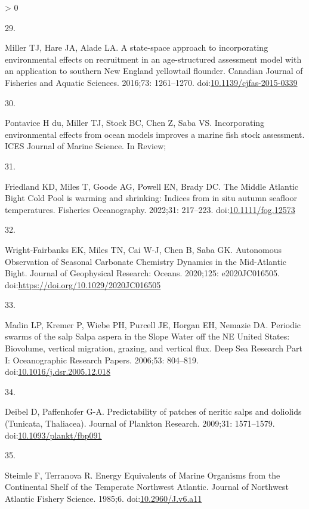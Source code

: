 \documentclass[
  10pt,
]{article}
\newlength{\cslhangindent}
\newlength{\csllabelwidth}
\newenvironment{CSLReferences}[2] %
 {%
  \setlength{\parindent}{0pt}
  \ifodd #1 \everypar{\setlength{\hangindent}{\cslhangindent}}\ignorespaces\fi
  \ifnum #2 > 0
  \setlength{\parskip}{#2\baselineskip}
  \fi
 }%
 {}
\newcommand{\CSLLeftMargin}[1]{\parbox[t]{\csllabelwidth}{#1}}
\newcommand{\CSLRightInline}[1]{\parbox[t]{\linewidth - \csllabelwidth}{#1}\break}
\begin{document}
\begin{CSLReferences}{0}{0}
\leavevmode\hypertarget{ref-miller_state-space_2016}{}%
\CSLLeftMargin{29. }
\CSLRightInline{Miller TJ, Hare JA, Alade LA. A state-space approach to
incorporating environmental effects on recruitment in an age-structured
assessment model with an application to southern {New} {England}
yellowtail flounder. Canadian Journal of Fisheries and Aquatic Sciences.
2016;73: 1261--1270.
doi:\href{https://doi.org/10.1139/cjfas-2015-0339}{10.1139/cjfas-2015-0339}}

\leavevmode\hypertarget{ref-du_pontavice_incorporating_nodate}{}%
\CSLLeftMargin{30. }
\CSLRightInline{Pontavice H du, Miller TJ, Stock BC, Chen Z, Saba VS.
Incorporating environmental effects from ocean models improves a marine
fish stock assessment. ICES Journal of Marine Science. In Review; }

\leavevmode\hypertarget{ref-friedland_middle_2022}{}%
\CSLLeftMargin{31. }
\CSLRightInline{Friedland KD, Miles T, Goode AG, Powell EN, Brady DC.
The {Middle} {Atlantic} {Bight} {Cold} {Pool} is warming and shrinking:
{Indices} from in situ autumn seafloor temperatures. Fisheries
Oceanography. 2022;31: 217--223.
doi:\href{https://doi.org/10.1111/fog.12573}{10.1111/fog.12573}}

\leavevmode\hypertarget{ref-wrightfairbanks_autonomous_2020}{}%
\CSLLeftMargin{32. }
\CSLRightInline{Wright‐Fairbanks EK, Miles TN, Cai W-J, Chen B, Saba GK.
Autonomous {Observation} of {Seasonal} {Carbonate} {Chemistry}
{Dynamics} in the {Mid}-{Atlantic} {Bight}. Journal of Geophysical
Research: Oceans. 2020;125: e2020JC016505.
doi:\url{https://doi.org/10.1029/2020JC016505}}

\leavevmode\hypertarget{ref-madin_periodic_2006}{}%
\CSLLeftMargin{33. }
\CSLRightInline{Madin LP, Kremer P, Wiebe PH, Purcell JE, Horgan EH,
Nemazie DA. Periodic swarms of the salp {Salpa} aspera in the {Slope}
{Water} off the {NE} {United} {States}: {Biovolume}, vertical migration,
grazing, and vertical flux. Deep Sea Research Part I: Oceanographic
Research Papers. 2006;53: 804--819.
doi:\href{https://doi.org/10.1016/j.dsr.2005.12.018}{10.1016/j.dsr.2005.12.018}}

\leavevmode\hypertarget{ref-deibel_predictability_2009}{}%
\CSLLeftMargin{34. }
\CSLRightInline{Deibel D, Paffenhofer G-A. Predictability of patches of
neritic salps and doliolids ({Tunicata}, {Thaliacea}). Journal of
Plankton Research. 2009;31: 1571--1579.
doi:\href{https://doi.org/10.1093/plankt/fbp091}{10.1093/plankt/fbp091}}

\leavevmode\hypertarget{ref-steimle_energy_1985}{}%
\CSLLeftMargin{35. }
\CSLRightInline{Steimle F, Terranova R. Energy {Equivalents} of {Marine}
{Organisms} from the {Continental} {Shelf} of the {Temperate}
{Northwest} {Atlantic}. Journal of Northwest Atlantic Fishery Science.
1985;6. doi:\href{https://doi.org/10.2960/J.v6.a11}{10.2960/J.v6.a11}}


\end{CSLReferences}
\end{document}
